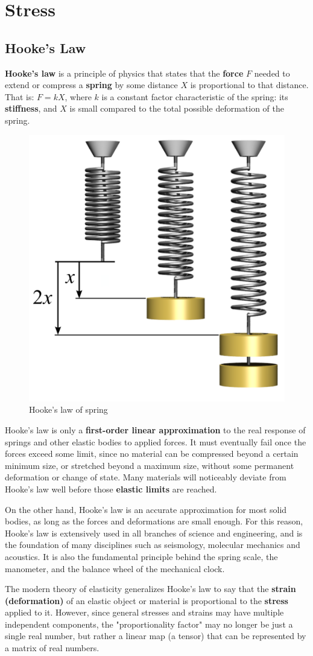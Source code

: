 
\chapter{Stress}
\section{Hooke's Law}
\textbf{Hooke's law} is a principle of physics that states that the \textbf{force} $ F $ needed to extend or compress a \textbf{spring} by some distance $ X $ is proportional to that distance. That is: $ F = kX $, where $ k $ is a constant factor characteristic of the spring: its \textbf{stiffness}, and $ X $ is small compared to the total possible deformation of the spring.

\begin{figure}[h]
\centering
\includegraphics[width=0.3\linewidth]{figures/Hookes-law-springs}
\caption{Hooke's law of spring}
\label{fig:Hookes-law-springs}
\end{figure}

Hooke's law is only a \textbf{first-order linear approximation} to the real response of springs and other elastic bodies to applied forces. It must eventually fail once the forces exceed some limit, since no material can be compressed beyond a certain minimum size, or stretched beyond a maximum size, without some permanent deformation or change of state. Many materials will noticeably deviate from Hooke's law well before those \textbf{elastic limits} are reached.

On the other hand, Hooke's law is an accurate approximation for most solid bodies, as long as the forces and deformations are small enough. For this reason, Hooke's law is extensively used in all branches of science and engineering, and is the foundation of many disciplines such as seismology, molecular mechanics and acoustics. It is also the fundamental principle behind the spring scale, the manometer, and the balance wheel of the mechanical clock.

The modern theory of elasticity generalizes Hooke's law to say that the \textbf{strain (deformation)} of an elastic object or material is proportional to the \textbf{stress} applied to it. However, since general stresses and strains may have multiple independent components, the "proportionality factor" may no longer be just a single real number, but rather a linear map (a tensor) that can be represented by a matrix of real numbers.

